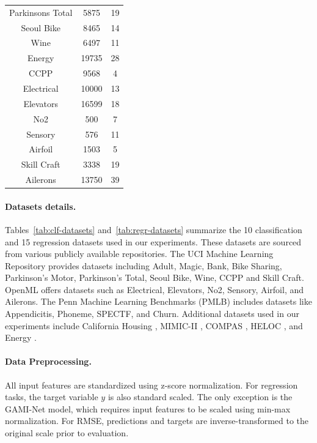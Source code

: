 \begin{table}[htbp]
\begin{minipage}{0.48\textwidth}
\begin{tabular}{ccc}
            Parkinsons Total & 5875 & 19 \\
            Seoul Bike & 8465 & 14 \\
            Wine & 6497 & 11 \\
            Energy & 19735 & 28 \\
            CCPP & 9568 & 4 \\
            Electrical & 10000 & 13 \\
            Elevators & 16599 & 18 \\
            No2 & 500 & 7 \\
            Sensory & 576 & 11 \\
            Airfoil & 1503 & 5 \\
            Skill Craft & 3338 & 19 \\
            Ailerons & 13750 & 39 \\
            \bottomrule
        \end{tabular}
    \end{minipage}
\end{table}

\paragraph{Datasets details.}
Tables~\ref{tab:clf-datasets} and~\ref{tab:regr-datasets} summarize the 10 classification and 15 regression datasets used in our experiments. These datasets are sourced from various publicly available repositories. The UCI Machine Learning Repository \cite{uci_ml} provides datasets including Adult, Magic, Bank, Bike Sharing, Parkinson’s Motor, Parkinson’s Total, Seoul Bike, Wine, CCPP and Skill Craft. OpenML \cite{OpenML2013} offers datasets such as Electrical, Elevators, No2, Sensory, Airfoil, and Ailerons. The Penn Machine Learning Benchmarks (PMLB) \cite{romano2021pmlb} includes datasets like Appendicitis, Phoneme, SPECTF, and Churn. Additional datasets used in our experiments include California Housing \cite{pace1997sparse}, MIMIC-II \cite{saeed2011mimic}, COMPAS \cite{propublica2016compas}, HELOC \cite{oliabev_heloc}, and Energy \cite{luism78_energydata, candanedo2017energy}. 

\paragraph{Data Preprocessing.}
All input features are standardized using z-score normalization. For regression tasks, the target variable $y$ is also standard scaled. The only exception is the GAMI-Net model, which requires input features to be scaled using min-max normalization.
For RMSE, predictions and targets are inverse-transformed to the original scale prior to evaluation.

